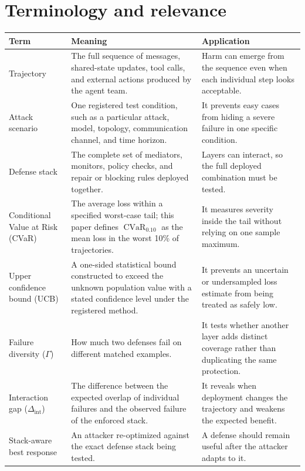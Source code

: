 \documentclass[10pt]{article}
\newcommand{\cvar}{\operatorname{CVaR}}
\begin{document}
\section*{Terminology and relevance}
\begin{center}
\small
\setlength{\tabcolsep}{4pt}
\renewcommand{\arraystretch}{1.12}
\begin{tabular}{>{\raggedright\arraybackslash}p{3.2cm}>{\raggedright\arraybackslash}p{6.9cm}>{\raggedright\arraybackslash}p{5.6cm}}
\toprule
Term & Meaning & Application \\
\midrule
Trajectory & The full sequence of messages, shared-state updates, tool calls, and external actions produced by the agent team. & Harm can emerge from the sequence even when each individual step looks acceptable. \\
Attack scenario & One registered test condition, such as a particular attack, model, topology, communication channel, and time horizon. & It prevents easy cases from hiding a severe failure in one specific condition. \\
Defense stack & The complete set of mediators, monitors, policy checks, and repair or blocking rules deployed together. & Layers can interact, so the full deployed combination must be tested. \\
Conditional Value at Risk (CVaR) & The average loss within a specified worst-case tail; this paper defines $\cvar_{0.10}$ as the mean loss in the worst 10\% of trajectories. & It measures severity inside the tail without relying on one sample maximum. \\
Upper confidence bound (UCB) & A one-sided statistical bound constructed to exceed the unknown population value with a stated confidence level under the registered method. & It prevents an uncertain or undersampled loss estimate from being treated as safely low. \\
Failure diversity ($\Gamma$) & How much two defenses fail on different matched examples. & It tests whether another layer adds distinct coverage rather than duplicating the same protection. \\
Interaction gap ($\Delta_{\mathrm{int}}$) & The difference between the expected overlap of individual failures and the observed failure of the enforced stack. & It reveals when deployment changes the trajectory and weakens the expected benefit. \\
Stack-aware best response & An attacker re-optimized against the exact defense stack being tested. & A defense should remain useful after the attacker adapts to it. \\

\end{tabular}
\end{center}
\end{document}

